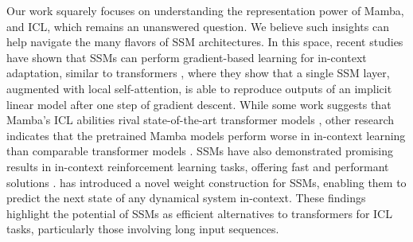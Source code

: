 Our work squarely focuses on understanding the representation power of Mamba, and ICL, which remains an unanswered question. We believe such insights can help navigate the many flavors of SSM architectures. In this space, recent studies have shown that SSMs can perform gradient-based learning for in-context adaptation, similar to transformers \cite{sushma2024state}, where they show that a single SSM layer, augmented with local self-attention, is able to reproduce outputs of an implicit linear model after one step of gradient descent. While some work suggests that Mamba's ICL abilities rival state-of-the-art transformer models \cite{grazzi2024mamba}, other research indicates that the pretrained Mamba models perform worse in in-context learning than comparable transformer models \cite{halloran2024mamba,akyurek2024context}. SSMs have also demonstrated promising results in in-context reinforcement learning tasks, offering fast and performant solutions \cite{lu2024structured}. \cite{joseph2024hippo} has introduced a novel weight construction for SSMs, enabling them to predict the next state of any dynamical system in-context. These findings highlight the potential of SSMs as efficient alternatives to transformers for ICL tasks, particularly those involving long input sequences.
